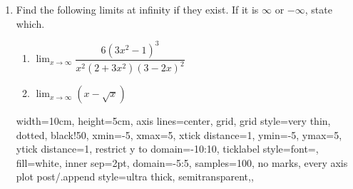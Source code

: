 \documentclass[12pt]{article}
\begin{document}
\begin{enumerate}

\item Find the following limits at infinity if they exist. If it is $\infty$ or $-\infty$, state which.

\begin{enumerate}
\item $\displaystyle\lim_{x\to\infty} \dfrac{6(3x^2-1)^3}{x^2(2+3x^2)(3-2x)^2}$
    \vspace{3in}

    \item $\displaystyle\lim_{x\to\infty} (x-\sqrt{x})$
    \vfill
\end{enumerate}

\pagebreak

\pgfplotsset%
{
    width=10cm, height=5cm,
    axis lines=center, 
    grid,
    grid style={very thin, dotted, black!50},
    xmin=-5,    xmax=5,         xtick distance=1,
    ymin=-5,    ymax=5,         ytick distance=1,
    restrict y to domain=-10:10, %
    ticklabel style={font=\scriptsize, fill=white, inner sep=2pt},
    domain=-5:5, samples=100,
    no marks, 
    every axis plot post/.append style={ultra thick, semitransparent,},
}


\end{enumerate}
\end{document}
